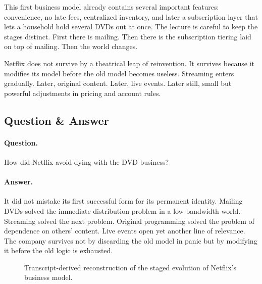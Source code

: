 This first business model already contains several important features: convenience, no late fees, centralized inventory, and later a subscription layer that lets a household hold several DVDs out at once. The lecture is careful to keep the stages distinct. First there is mailing. Then there is the subscription tiering laid on top of mailing. Then the world changes.

Netflix does not survive by a theatrical leap of reinvention. It survives because it modifies its model before the old model becomes useless. Streaming enters gradually. Later, original content. Later, live events. Later still, small but powerful adjustments in pricing and account rules.

\subsection{Question \& Answer}

\paragraph{Question.} How did Netflix avoid dying with the DVD business?

\paragraph{Answer.} It did not mistake its first successful form for its permanent identity. Mailing DVDs solved the immediate distribution problem in a low-bandwidth world. Streaming solved the next problem. Original programming solved the problem of dependence on others' content. Live events open yet another line of relevance. The company survives not by discarding the old model in panic but by modifying it before the old logic is exhausted.

\begin{figure}[htbp]
\centering
{}
\caption{Transcript-derived reconstruction of the staged evolution of Netflix's business model.}
\end{figure}

